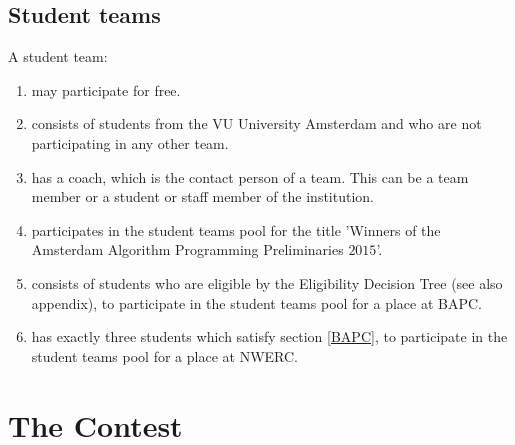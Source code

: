 \documentclass[11pt]{report}
\begin{document}
\section{Student teams}
A student team:
\begin{enumerate}[label=\bfseries 3.1.\arabic*]
\item may participate for free.
\item consists of students from the VU University Amsterdam and who are not participating in any other team.
\item has a coach, which is the contact person of a team. This can be a team member or a student or staff member of the institution.
\item participates in the student teams pool for the title 'Winners of the Amsterdam Algorithm Programming Preliminaries $2015$'.
\item \label{BAPC} consists of students who are eligible by the Eligibility Decision Tree (see also appendix), to participate in the student teams pool for a place at BAPC.
\item \label{NWERC} has exactly three students which satisfy section \ref{BAPC}, to participate in the student teams pool for a place at NWERC.
\end{enumerate}


\chapter{The Contest}
\end{document}
